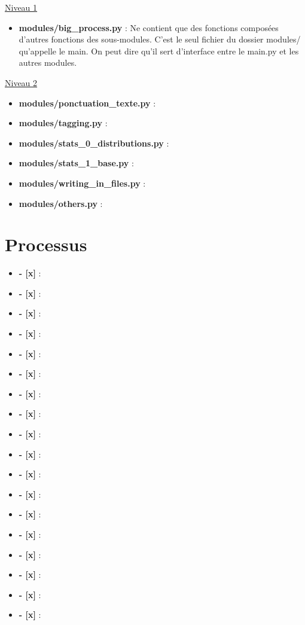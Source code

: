 \underline{Niveau 1}
	\begin{itemize}
	\item \textbf{modules/big\_process.py} : Ne contient que des fonctions composées d'autres fonctions des sous-modules. C'est le seul fichier du dossier modules/ qu'appelle le main. On peut dire qu'il sert d'interface entre le main.py et les autres modules.
	
	\end{itemize}

\underline{Niveau 2}
	\begin{itemize}
	\item \textbf{modules/ponctuation\_texte.py} :
	
	\item \textbf{modules/tagging.py} :
	
	\item \textbf{modules/stats\_0\_distributions.py} :
	
	\item \textbf{modules/stats\_1\_base.py} :
	
	\item \textbf{modules/writing\_in\_files.py} :

	\item \textbf{modules/others.py} :
	\end{itemize}

\newpage
\section{Processus}

\begin{itemize}
\item \textbf{- [x]} : 
\item \textbf{- [x]} : 
\item \textbf{- [x]} : 
\item \textbf{- [x]} : 
\item \textbf{- [x]} : 
\item \textbf{- [x]} : 
\item \textbf{- [x]} : 
\item \textbf{- [x]} : 
\item \textbf{- [x]} : 
\item \textbf{- [x]} : 
\item \textbf{- [x]} : 
\item \textbf{- [x]} : 
\item \textbf{- [x]} : 
\item \textbf{- [x]} : 
\item \textbf{- [x]} : 
\item \textbf{- [x]} : 
\item \textbf{- [x]} : 
\item \textbf{- [x]} : 
\end{itemize}








